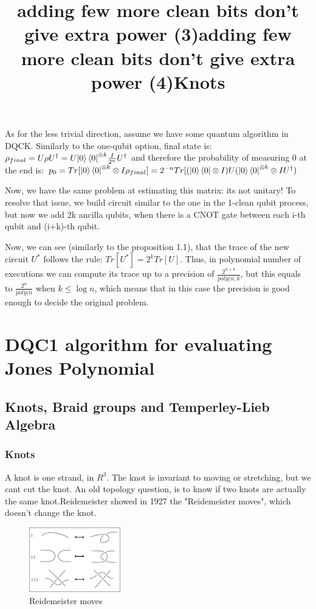 \documentclass{article}
\begin{document}
\title{adding few more clean bits don't give extra power (3)}
As for the less trivial direction, assume we have some quantum algorithm in DQCK.
Similarly to the one-qubit option, final state is:
$\rho_{final} = U\rho{U^\dagger} = U{\left\vert{0}\right\rangle\left\langle{0}\right\vert}^{\otimes k}\frac{I}{2^n}{U^\dagger}$
and therefore the probability of measuring 0 at the end is:
$p_{0} = Tr[{\Ket{0}\Bra{0}}^{\otimes k} \otimes I\rho_{final}] = 2^{-n}Tr[(\Ket{0}\Bra{0}\otimes I)U({\Ket{0}\Bra{0}}^{\otimes k}\otimes I{U^\dagger})$

Now, we have the same problem at estimating this matrix: its not unitary!
To resolve that issue, we build circuit similar to the one in the 1-clean qubit process,
but now we add 2k ancilla qubits, when there is a CNOT gate between each i-th qubit and (i+k)-th qubit.



\title{adding few more clean bits don't give extra power (4)}
Now, we can see (similarly to the proposition 1.1), that the trace of the new circuit $U^{*}$ follows the rule: $Tr[U^{*}] = 2^{k}Tr[U]$. Thus, in polynomial number of executions we can compute its trace up to a precision of $\frac{2^{n+k}}{poly(n,k}$, but this equals to $\frac{2^{n}}{poly(n}$ when $k  \leq \log{n}$, which means that in this case the precision is good enough to decide the original problem.



\section{DQC1 algorithm for evaluating Jones Polynomial}
\subsection{Knots, Braid groups and Temperley-Lieb Algebra}
\subsubsection{Knots}
\title{Knots}
A knot is one strand, in $R^3$. The knot is invariant to moving or stretching, but we cant cut the knot.
An old topology question, is to know if two knots are actually the same knot.Reidemeister showed in 1927
the "Reidemeister moves", which doesn't change the knot.
\begin{figure}
\includegraphics[scale=0.5]{Reidemeister} 
\caption{Reidemeister moves}
\end{figure}
\end{document}
